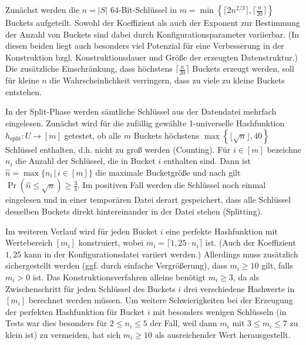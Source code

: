 \documentclass[a4paper,12pt,twoside]{report}
\begin{document}
Zunächst werden die $n=|S|$ 64-Bit-Schlüssel in $m=\min\left\{\lceil 2 n^{2/3}\rceil, \lceil\frac{n}{20}\rceil\right\}$ Buckets aufgeteilt.
Sowohl der Koeffizient als auch der Exponent zur Bestimmung der Anzahl von Buckets sind dabei durch Konfigurationsparameter variierbar.
(In diesen beiden liegt auch besonders viel Potenzial für eine Verbesserung in der Konstruktion bzgl. Konstruktionsdauer und Größe der erzeugten Datenstruktur.)
Die zusätzliche Einschränkung, dass höchstens $\lceil\frac{n}{20}\rceil$ Buckets erzeugt werden, soll für kleine $n$ die Wahrscheinlichkeit verringern, dass zu viele zu kleine Buckets entstehen.

\pagebreak

In der Split-Phase werden sämtliche Schlüssel aus der Datendatei mehrfach eingelesen.
Zunächst wird für die zufällig gewählte 1-universelle Hashfunktion $h_{\text{split}}\colon U\to [m]$ getestet, ob alle $m$ Buckets höchstens $\max\left\{\lfloor\sqrt{n}\rfloor, 40\right\}$ Schlüssel enthalten, d.h. nicht zu groß werden (Counting).
Für $i\in[m]$ bezeichne $n_i$ die Anzahl der Schlüssel, die in Bucket $i$ enthalten sind.
Dann ist $\hat{n}=\max\{n_i\,|\,i\in[m]\}$ die maximale Bucketgröße und nach \cite[Lemma 1]{Dietzfelbinger2007} gilt $\Pr\left(\hat{n}\le\sqrt{n}\right)\ge\frac{3}{4}$.
Im positiven Fall werden die Schlüssel noch einmal eingelesen und in einer temporären Datei derart gespeichert, dass alle Schlüssel desselben Buckets direkt hintereinander in der Datei stehen (Splitting).

Im weiteren Verlauf wird für jeden Bucket $i$ eine perfekte Hashfunktion mit Wertebereich $[m_i]$ konstruiert, wobei $m_i=\lceil1,25\cdot n_i\rceil$ ist. (Auch der Koeffizient $1,25$ kann in der Konfigurationsdatei variiert werden.)
Allerdings muss zusätzlich sichergestellt werden (ggf. durch einfache Vergrößerung), dass $m_i\ge 10$ gilt, falls $m_i>0$ ist.
Das Konstruktionsverfahren alleine benötigt $m_i\ge 3$, da als Zwischenschritt für jeden Schlüssel des Buckets $i$ drei verschiedene Hashwerte in $[m_i]$ berechnet werden müssen.
Um weitere Schwierigkeiten bei der Erzeugung der perfekten Hashfunktion für Bucket $i$ mit besonders wenigen Schlüsseln (in Tests war dies besonders für $2\le n_i\le 5$ der Fall, weil dann $m_i$ mit $3\le m_i\le 7$ zu klein ist) zu vermeiden, hat sich $m_i\ge 10$ als ausreichender Wert herausgestellt.
\end{document}
